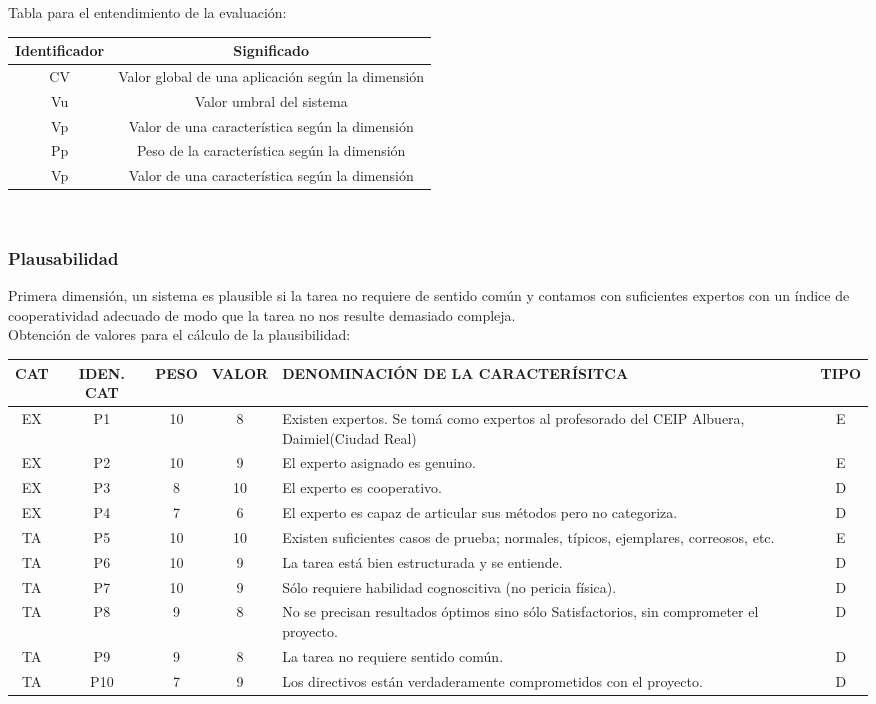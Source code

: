 \documentclass[letterpaper,12pt]{article}
\begin{document}
Tabla para el entendimiento de la evaluación: \\

\begin{center}
	\begin{tabular}{|c|c|}
\hline 
Identificador & Significado \\ 
\hline 
CV & Valor global de una aplicación según la dimensión \\ 
\hline 
Vu & Valor umbral del sistema \\ 
\hline 
Vp & Valor de una característica según la dimensión \\ 
\hline 
Pp & Peso de la característica según la dimensión \\ 
\hline 
Vp & Valor de una característica según la dimensión \\ 
\hline 
\end{tabular} \\
\end{center}
\newpage
\subsubsection{Plausabilidad}
Primera dimensión, un sistema es plausible si la tarea no requiere de sentido común y contamos con suficientes expertos con un índice de cooperatividad adecuado de modo que la tarea no nos resulte demasiado compleja. \\

Obtención de valores para el cálculo de la plausibilidad: \\
\begin{tabular}{|c|c|c|c|p{7.3 cm}|c|}
\hline 
CAT & IDEN. CAT & PESO & VALOR & DENOMINACIÓN DE LA CARACTERÍSITCA & TIPO \\ 
\hline 
EX & P1 & 10 & 8 & Existen expertos. Se tomá como expertos al profesorado del CEIP Albuera, Daimiel(Ciudad Real) & E \\ 
\hline 
EX & P2 & 10 & 9 & El experto asignado es genuino. & E \\ 
\hline 
EX & P3 & 8 & 10 & El experto es cooperativo. & D \\ 
\hline 
EX & P4 & 7 & 6 & El experto es capaz de articular sus métodos pero no categoriza. & D \\ 
\hline 
TA & P5 & 10 & 10 & Existen suficientes casos de prueba; normales, típicos, ejemplares, correosos, etc. & E \\ 
\hline 
TA & P6 & 10 & 9 & La tarea está bien estructurada y se entiende. & D \\ 
\hline 
TA & P7 & 10 & 9 & Sólo requiere habilidad cognoscitiva (no pericia física). & D \\ 
\hline 
TA & P8 & 9 & 8 & No se precisan resultados óptimos sino sólo Satisfactorios, sin comprometer el proyecto. & D \\ 
\hline 
TA & P9 & 9 & 8 & La tarea no requiere sentido común. & D \\ 
\hline 
TA & P10 & 7 & 9 & Los directivos están verdaderamente comprometidos con el proyecto. & D \\ 
\hline 
\end{tabular} \\
\end{document}
